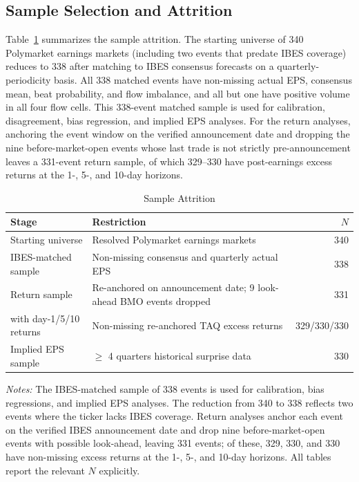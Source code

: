 \documentclass[11pt]{article}
\begin{document}
\subsection{Sample Selection and Attrition} \label{sec:attrition}

Table~\ref{tab:attrition} summarizes the sample attrition. The starting universe of 340 Polymarket earnings markets (including two events that predate IBES coverage) reduces to 338 after matching to IBES consensus forecasts on a quarterly-periodicity basis. All 338 matched events have non-missing actual EPS, consensus mean, beat probability, and flow imbalance, and all but one have positive volume in all four flow cells. This 338-event matched sample is used for calibration, disagreement, bias regression, and implied EPS analyses. For the return analyses, anchoring the event window on the verified announcement date and dropping the nine before-market-open events whose last trade is not strictly pre-announcement leaves a 331-event return sample, of which 329--330 have post-earnings excess returns at the 1-, 5-, and 10-day horizons.

\begin{table}[htbp]
\centering
\begin{threeparttable}
\caption{Sample Attrition}
\label{tab:attrition}
\begin{tabular}{llr}
\toprule
Stage & Restriction & $N$ \\
\midrule
Starting universe & Resolved Polymarket earnings markets & 340 \\
IBES-matched sample & Non-missing consensus and quarterly actual EPS & 338 \\
Return sample & Re-anchored on announcement date; 9 look-ahead BMO events dropped & 331 \\
\quad with day-1/5/10 returns & Non-missing re-anchored TAQ excess returns & 329/330/330 \\
Implied EPS sample & $\geq$ 4 quarters historical surprise data & 330 \\
\bottomrule
\end{tabular}
\begin{tablenotes}
\small
\item \textit{Notes:} The IBES-matched sample of 338 events is used for calibration, bias regressions, and implied EPS analyses. The reduction from 340 to 338 reflects two events where the ticker lacks IBES coverage. Return analyses anchor each event on the verified IBES announcement date and drop nine before-market-open events with possible look-ahead, leaving 331 events; of these, 329, 330, and 330 have non-missing excess returns at the 1-, 5-, and 10-day horizons. All tables report the relevant $N$ explicitly.
\end{tablenotes}
\end{threeparttable}
\end{table}
\end{document}
